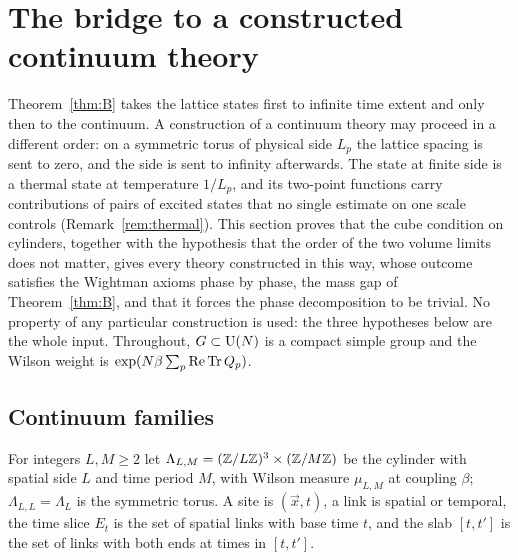 \section{The bridge to a constructed continuum theory}\label{sec:bridge}

Theorem~\ref{thm:B} takes the lattice states first to infinite time extent
and only then to the continuum. A construction of a continuum theory may
proceed in a different order: on a symmetric torus of physical side $L_p$
the lattice spacing is sent to zero, and the side is sent to infinity
afterwards. The state at finite side is a thermal state at
temperature $1/L_p$, and its two-point functions carry contributions of
pairs of excited states that no single estimate on one scale controls
(Remark~\ref{rem:thermal}). This section proves that the cube condition on
cylinders, together with the hypothesis that the order of the two volume
limits does not matter, gives every theory constructed in this way, whose
outcome satisfies the Wightman axioms phase by phase, the mass gap of
Theorem~\ref{thm:B}, and that it forces the phase decomposition to be
trivial. No property of any particular construction is used: the three
hypotheses below are the whole input. Throughout, $G\subset\mathrm{U}(N)$ is a compact
simple group and the Wilson weight is $\exp(N\beta\sum_p\operatorname{Re}\operatorname{Tr} Q_p)$.

\subsection{Continuum families}\label{ssec:families}

For integers $L,M\ge2$ let $\Lambda_{L,M}=(\mathbb{Z}/L\mathbb{Z})^3\times(\mathbb{Z}/M\mathbb{Z})$ be the
cylinder with spatial side $L$ and time period $M$, with Wilson measure
$\mu_{L,M}$ at coupling $\beta$; $\Lambda_{L,L}=\Lambda_L$ is the symmetric
torus. A site is $(\vec x,t)$, a link is spatial or temporal, the time slice
$E_t$ is the set of spatial links with base time $t$, and the slab $[t,t']$
is the set of links with both ends at times in $[t,t']$.

